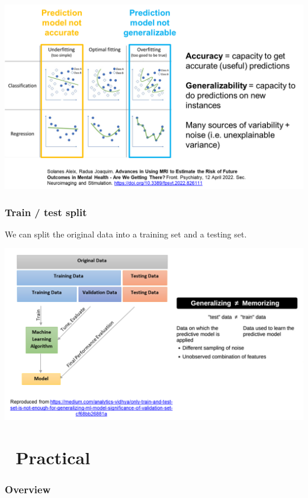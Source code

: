 \documentclass[
  letterpaper,
  DIV=11,
  numbers=noendperiod,
  oneside]{scrreprt}
\begin{document}
\includegraphics{./images/paste-FC3A1160.png}

\hypertarget{train-test-split}{%
\subsection{Train / test split}\label{train-test-split}}

We can split the original data into a training set and a testing set.

\includegraphics{./images/paste-7D73149D.png}

\hypertarget{practical}{%
\chapter{\texorpdfstring{{📙}
Practical}{📙 Practical}}\label{practical}}

\hypertarget{overview-9}{%
\subsection{Overview}\label{overview-9}}
\end{document}

